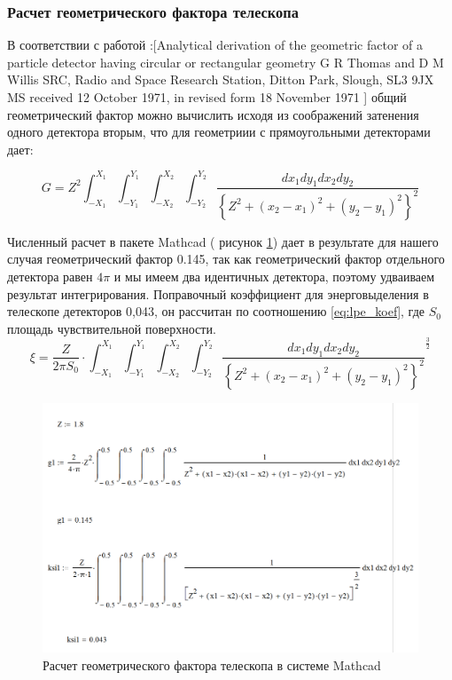 \subsubsection{Расчет геометрического фактора телескопа}
В соответствии с работой :[Analytical derivation of the
geometric factor of a
particle detector having
circular or rectangular
geometry
G R Thomas and D M Willis
SRC, Radio and Space Research Station, Ditton Park,
Slough, SL3 9JX
MS received 12 October 1971, in revised form 18 November
1971 ] общий геометрический фактор можно вычислить исходя из соображений затенения одного детектора вторым, что для геометриии с прямоугольными детекторами дает:

\[ G = Z^2 \int_{-X_1}^{X_1} \int_{-Y_1}^{Y_1} 
			\int_{-X_2}^{X_2} \int_{-Y_2}^{Y_2}
			\frac{dx_1dy_1dx_2dy_2}{\left\lbrace Z^2 + (x_2-x_1)^2 + (y_2-y_1)^2\right\rbrace^2 }\]

Численный расчет в пакете Mathcad ( рисунок \ref{fig:mathcadGeomfactor}) дает в результате для нашего случая геометрический фактор 0.145,  так как геометрический фактор отдельного детектора равен $ 4\pi $ и мы имеем два идентичных детектора, поэтому удваиваем результат интегрирования. Поправочный коэффициент для энерговыделения в телескопе детекторов 0,043, он рассчитан по соотношению \ref{eq:lpe_koef}, где $ S_0 $ площадь чувствительной поверхности.
\begin{equation}\label{eq:lpe_koef}
 \xi = \frac{Z}{2 \pi S_0 } \cdot \int_{-X_1}^{X_1} \int_{-Y_1}^{Y_1} 
\int_{-X_2}^{X_2} \int_{-Y_2}^{Y_2}
\frac{dx_1dy_1dx_2dy_2}{\left\lbrace Z^2 + (x_2-x_1)^2 + (y_2-y_1)^2\right\rbrace^2 }^{\frac{3}{2}}
\end{equation}




\begin{figure}[h!]
\centering
\includegraphics[width=0.7\linewidth]{images/mathcadGeomfactor1}
\caption{ Расчет геометрического фактора телескопа в системе Mathcad}
\label{fig:mathcadGeomfactor}
\end{figure}


